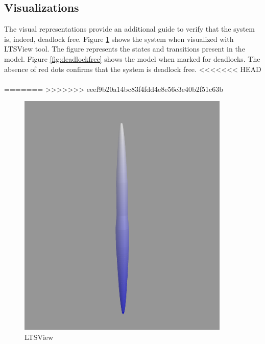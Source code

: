 \documentclass[a4paper,12pt]{article}
\begin{document}
	\subsection{Visualizations}
	The visual representations provide an additional guide to verify that the system is, indeed, deadlock free. Figure \ref{fig:ltsview-1} shows the system when visualized with LTSView tool. The figure represents the states and transitions present in the model. Figure \ref{fig:deadlockfree} shows the model when marked for deadlocks. The absence of red dots confirms that the system is deadlock free.
<<<<<<< HEAD
	\\
	\\
=======
>>>>>>> eeef9b20a14bc83f4fdd4e8e56c3e40b2f51c63b
	\begin{figure}[ht]
		\centering
		\begin{minipage}{0.45\textwidth}
			\centering
			\includegraphics[width=0.9\textwidth]{3D-Model.png} \caption{LTSView}
			\label{fig:ltsview-1}
		\end{minipage}\hfill
		\begin{minipage}{0.45\textwidth}
			\centering

\end{minipage}
\end{figure}
\end{document}
